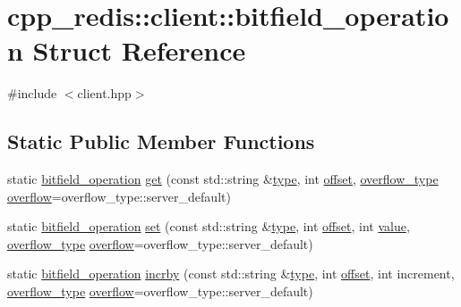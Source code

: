 \hypertarget{structcpp__redis_1_1client_1_1bitfield__operation}{}\section{cpp\+\_\+redis\+:\+:client\+:\+:bitfield\+\_\+operation Struct Reference}
\label{structcpp__redis_1_1client_1_1bitfield__operation}


{\ttfamily \#include $<$client.\+hpp$>$}

\subsection*{Static Public Member Functions}
\begin{DoxyCompactItemize}
\item 
static \mbox{\hyperlink{structcpp__redis_1_1client_1_1bitfield__operation}{bitfield\+\_\+operation}} \mbox{\hyperlink{structcpp__redis_1_1client_1_1bitfield__operation_a93d3f7ab6b6bae82ac209bb49374d788}{get}} (const std\+::string \&\mbox{\hyperlink{structcpp__redis_1_1client_1_1bitfield__operation_adbbf30e5138d0524940d536b2bc71480}{type}}, int \mbox{\hyperlink{structcpp__redis_1_1client_1_1bitfield__operation_a8a4e83ddbac5c3500c6960f54e736598}{offset}}, \mbox{\hyperlink{classcpp__redis_1_1client_a4119182ad3a01c1bb626a174375e114a}{overflow\+\_\+type}} \mbox{\hyperlink{structcpp__redis_1_1client_1_1bitfield__operation_a2f478e17655a249080178034faa0f6f2}{overflow}}=overflow\+\_\+type\+::server\+\_\+default)
\item 
static \mbox{\hyperlink{structcpp__redis_1_1client_1_1bitfield__operation}{bitfield\+\_\+operation}} \mbox{\hyperlink{structcpp__redis_1_1client_1_1bitfield__operation_a422fc09f99579cea5fcbcbc3464cdd4e}{set}} (const std\+::string \&\mbox{\hyperlink{structcpp__redis_1_1client_1_1bitfield__operation_adbbf30e5138d0524940d536b2bc71480}{type}}, int \mbox{\hyperlink{structcpp__redis_1_1client_1_1bitfield__operation_a8a4e83ddbac5c3500c6960f54e736598}{offset}}, int \mbox{\hyperlink{structcpp__redis_1_1client_1_1bitfield__operation_a8104441f6b9ee7cbf5e6ee6c17c7445c}{value}}, \mbox{\hyperlink{classcpp__redis_1_1client_a4119182ad3a01c1bb626a174375e114a}{overflow\+\_\+type}} \mbox{\hyperlink{structcpp__redis_1_1client_1_1bitfield__operation_a2f478e17655a249080178034faa0f6f2}{overflow}}=overflow\+\_\+type\+::server\+\_\+default)
\item 
static \mbox{\hyperlink{structcpp__redis_1_1client_1_1bitfield__operation}{bitfield\+\_\+operation}} \mbox{\hyperlink{structcpp__redis_1_1client_1_1bitfield__operation_a9e3ad296a689764917df9da1424f33d5}{incrby}} (const std\+::string \&\mbox{\hyperlink{structcpp__redis_1_1client_1_1bitfield__operation_adbbf30e5138d0524940d536b2bc71480}{type}}, int \mbox{\hyperlink{structcpp__redis_1_1client_1_1bitfield__operation_a8a4e83ddbac5c3500c6960f54e736598}{offset}}, int increment, \mbox{\hyperlink{classcpp__redis_1_1client_a4119182ad3a01c1bb626a174375e114a}{overflow\+\_\+type}} \mbox{\hyperlink{structcpp__redis_1_1client_1_1bitfield__operation_a2f478e17655a249080178034faa0f6f2}{overflow}}=overflow\+\_\+type\+::server\+\_\+default)
\end{DoxyCompactItemize}
